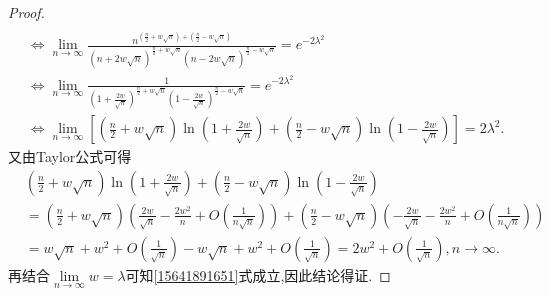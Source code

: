 \documentclass[../../main.tex]{subfiles}%
\begin{document}
\begin{proof}
\begin{align}
\nonumber
\\
&\iff \lim_{n\rightarrow \infty} \frac{n^{\left( \frac{n}{2}+w\sqrt{n} \right) +\left( \frac{n}{2}-w\sqrt{n} \right)}}{(n+2w\sqrt{n})^{\frac{n}{2}+w\sqrt{n}}(n-2w\sqrt{n})^{\frac{n}{2}-w\sqrt{n}}}=e^{-2\lambda ^2}
\nonumber
\\
&\iff \lim_{n\rightarrow \infty} \frac{1}{\left( 1+\frac{2w}{\sqrt{n}} \right) ^{\frac{n}{2}+w\sqrt{n}}\left( 1-\frac{2w}{\sqrt{n}} \right) ^{\frac{n}{2}-w\sqrt{n}}}=e^{-2\lambda ^2}
\nonumber
\\
&\iff \lim_{n\rightarrow \infty} \left[ \left( \frac{n}{2}+w\sqrt{n} \right) \ln \left( 1+\frac{2w}{\sqrt{n}} \right) +\left( \frac{n}{2}-w\sqrt{n} \right) \ln \left( 1-\frac{2w}{\sqrt{n}} \right) \right] =2\lambda ^2.\label{15641891651}
\end{align}
又由Taylor公式可得
\begin{align*}
&\left( \frac{n}{2}+w\sqrt{n} \right) \ln \left( 1+\frac{2w}{\sqrt{n}} \right) +\left( \frac{n}{2}-w\sqrt{n} \right) \ln \left( 1-\frac{2w}{\sqrt{n}} \right) 
\\
&=\left( \frac{n}{2}+w\sqrt{n} \right) \left( \frac{2w}{\sqrt{n}}-\frac{2w^2}{n}+O\left( \frac{1}{n\sqrt{n}} \right) \right) +\left( \frac{n}{2}-w\sqrt{n} \right) \left( -\frac{2w}{\sqrt{n}}-\frac{2w^2}{n}+O\left( \frac{1}{n\sqrt{n}} \right) \right) 
\\
&=w\sqrt{n}+w^2+O\left( \frac{1}{\sqrt{n}} \right) -w\sqrt{n}+w^2+O\left( \frac{1}{\sqrt{n}} \right) =2w^2+O\left( \frac{1}{\sqrt{n}} \right) ,n\to \infty.
\end{align*}
再结合$\underset{n\rightarrow \infty}{\lim}w=\lambda$可知\eqref{15641891651}式成立,因此结论得证.

\end{proof}
\end{document}
